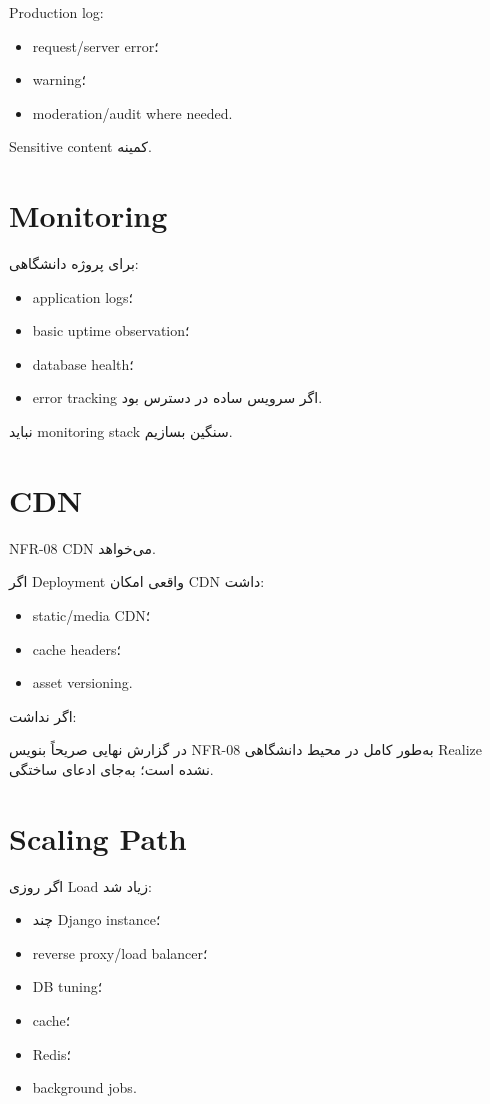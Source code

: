 Production log:
\begin{itemize}
  \item request/server error؛
  \item warning؛
  \item moderation/audit where needed.
\end{itemize}

Sensitive content کمینه.

\section{Monitoring}

برای پروژه دانشگاهی:
\begin{itemize}
  \item application logs؛
  \item basic uptime observation؛
  \item database health؛
  \item error tracking اگر سرویس ساده در دسترس بود.
\end{itemize}

نباید monitoring stack سنگین بسازیم.

\section{CDN}

NFR-08 CDN می‌خواهد.

اگر Deployment واقعی امکان CDN داشت:
\begin{itemize}
  \item static/media CDN؛
  \item cache headers؛
  \item asset versioning.
\end{itemize}

اگر نداشت:
\begin{warningbox}
در گزارش نهایی صریحاً بنویس NFR-08 به‌طور کامل در محیط دانشگاهی Realize نشده است؛ به‌جای ادعای ساختگی.
\end{warningbox}

\section{Scaling Path}

اگر روزی Load زیاد شد:
\begin{itemize}
  \item چند Django instance؛
  \item reverse proxy/load balancer؛
  \item DB tuning؛
  \item cache؛
  \item Redis؛
  \item background jobs.
\end{itemize}

